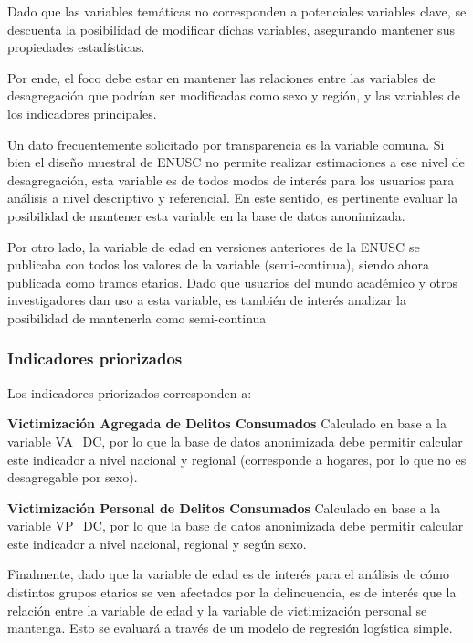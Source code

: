 \documentclass[]{book}
\theoremstyle{definition}
\theoremstyle{definition}
\theoremstyle{definition}
\theoremstyle{definition}
\theoremstyle{remark}
\begin{document}
Dado que las variables temáticas no corresponden a potenciales variables clave, se descuenta la posibilidad de modificar dichas variables, asegurando mantener sus propiedades estadísticas.

Por ende, el foco debe estar en mantener las relaciones entre las variables de desagregación que podrían ser modificadas como sexo y región, y las variables de los indicadores principales.

Un dato frecuentemente solicitado por transparencia es la variable comuna. Si bien el diseño muestral de ENUSC no permite realizar estimaciones a ese nivel de desagregación, esta variable es de todos modos de interés para los usuarios para análisis a nivel descriptivo y referencial. En este sentido, es pertinente evaluar la posibilidad de mantener esta variable en la base de datos anonimizada.

Por otro lado, la variable de edad en versiones anteriores de la ENUSC se publicaba con todos los valores de la variable (semi-continua), siendo ahora publicada como tramos etarios. Dado que usuarios del mundo académico y otros investigadores dan uso a esta variable, es también de interés analizar la posibilidad de mantenerla como semi-continua

\hypertarget{indicadores-priorizados}{%
\subsubsection{Indicadores priorizados}\label{indicadores-priorizados}}

Los indicadores priorizados corresponden a:

\textbf{Victimización Agregada de Delitos Consumados}
Calculado en base a la variable VA\_DC, por lo que la base de datos anonimizada debe permitir calcular este indicador a nivel nacional y regional (corresponde a hogares, por lo que no es desagregable por sexo).

\textbf{Victimización Personal de Delitos Consumados}
Calculado en base a la variable VP\_DC, por lo que la base de datos anonimizada debe permitir calcular este indicador a nivel nacional, regional y según sexo.

Finalmente, dado que la variable de edad es de interés para el análisis de cómo distintos grupos etarios se ven afectados por la delincuencia, es de interés que la relación entre la variable de edad y la variable de victimización personal se mantenga. Esto se evaluará a través de un modelo de regresión logística simple.
\end{document}

